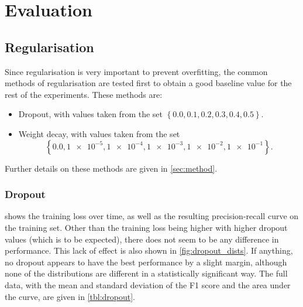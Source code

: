 \section{Evaluation}
\FloatBarrier%

\subsection{Regularisation}
Since regularisation is very important to prevent overfitting, the common
methods of regularisation are tested first to obtain a good baseline value for the
rest of the experiments. These methods are:
\begin{itemize}
  \item Dropout, with values taken from the set
    $\left\{0.0, 0.1, 0.2, 0.3, 0.4, 0.5\right\}$.
  \item Weight decay, with values taken from the set
    \[\left\{0.0, \num{1e-5}, \num{1e-4}, \num{1e-3}, \num{1e-2},
    \num{1e-1}\right\}.\]
\end{itemize}
Further details on these methods are given in \cref{sec:method}.

\subsubsection{Dropout}
 shows the training loss over time, as well as the
resulting precision-recall curve on the training set. Other than the training
loss being higher with higher dropout values (which is to be expected), there
does not seem to be any difference in performance. This lack of effect is
also shown in \cref{fig:dropout_dists}. If anything, no dropout appears to have
the best performance by a slight margin, although none of the distributions are
different in a statistically significant way. The full data, with the mean and
standard deviation of the F1 score and the area under the curve, are given in
\cref{tbl:dropout}.


